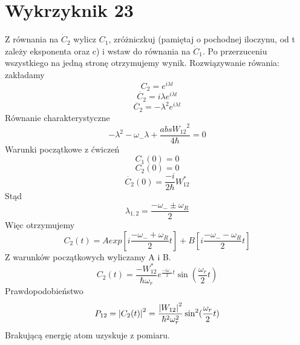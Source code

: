 \documentclass[a4paper,12pt]{article}
\begin{document}
\section{Wykrzyknik 23}
Z równania na $\dot{C}_2$ wylicz $C_1$, zróżniczkuj (pamiętaj o pochodnej
iloczynu, od t zależy eksponenta oraz c) i wstaw do równania na $\dot{C}_1$. Po
przerzuceniu wszystkiego na jedną stronę otrzymujemy wynik. 
Rozwiązywanie rówania:
zakładamy
\begin{equation*}
  C_2 = e^{i\lambda t}
\end{equation*}
\begin{equation*}
  \dot{C_2} = i\lambda e^{i\lambda t}
\end{equation*}
\begin{equation*}
  \ddot{C_2} = -\lambda^2 e^{i\lambda t}
\end{equation*}
Równanie charakterystyczne
\begin{equation*}
  -\lambda^2 - \omega_{-} \lambda + \frac{abs{W_{12}}^2}{4\hbar} = 0
\end{equation*}
Warunki początkowe z ćwiczeń
\begin{equation*}
	C_1(0) = 0
\end{equation*}
\begin{equation*}
	C_2(0) = 0
\end{equation*}
\begin{equation*}
	\dot{C_2}(0) = \frac{-i}{2\hbar}W_{12}^*
\end{equation*}
Stąd 
\begin{equation*}
  \lambda_{1,2} = \frac{-\omega_{-} \pm \omega_{R}}{2}
\end{equation*}
Więc otrzymujemy
\begin{equation*}
  C_2(t) = A exp\left[ i \frac{-\omega_{-} + \omega_{R}}{2} t\right] + B \left[
  i \frac{-\omega_{-} - \omega_{R}}{2} t\right] 
\end{equation*}
Z warunków początkowych wyliczamy A i B.
\begin{equation*}
  C_2(t) = \frac{-W_{12}^*}{\hbar \omega_r}e^{\frac{-i\omega_{-}}{2}t}
  \sin(\frac{\omega_r}{2}t)
\end{equation*}
Prawdopodobieństwo
\begin{equation*}
  P_{12} = \abs{C_2(t)}^2 = \frac{\abs{W_{12}}^2}{\hbar^2 \omega_r^2}
  \sin^2(\frac{\omega_r}{2}t)
\end{equation*}
Brakującą energię atom uzyskuje z pomiaru.
\end{document}
